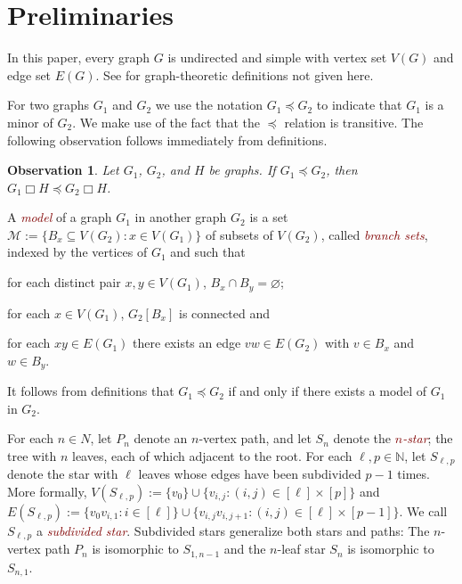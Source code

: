 \documentclass[12pt]{article}
\newcommand{\defn}[1]{\textcolor{Maroon}{\emph{#1}}}
\newcommand{\boxprod}{\mathbin{\Box}}
\newcommand{\N}{\mathbb{N}}
\renewcommand{\emptyset}{\varnothing}
\theoremstyle{plain}
\newtheorem{obs}[thm]{Observation}
\theoremstyle{definition}
\begin{document}
\section{Preliminaries}

In this paper, every graph $G$ is undirected and simple with vertex set $V(G)$ and edge set $E(G)$. See \citep{D10} for graph-theoretic definitions not given here. 




For two graphs $G_1$ and $G_2$ we use the notation $G_1\preceq G_2$ to indicate that $G_1$ is a minor of $G_2$.  We make use of the fact that the $\preceq$ relation is transitive. The following observation follows immediately from definitions.

\begin{obs}\label{minor_product}
  Let $G_1$, $G_2$, and $H$ be graphs.  If $G_1\preceq G_2$, then $G_1\boxprod H\preceq G_2\boxprod H$.
\end{obs}

A \defn{model} of a graph $G_1$ in another graph $G_2$ is a set $\mathcal{M}:=\{B_x\subseteq V(G_2): x\in V(G_1)\}$ of subsets of $V(G_2)$, called \defn{branch sets}, indexed by the vertices of $G_1$ and such that
\begin{compactenum}[(i)]
  \item for each distinct pair $x,y\in V(G_1)$, $B_x\cap B_y=\emptyset$;
  \item for each $x\in V(G_1)$, $G_2[B_x]$ is connected and
  \item for each $xy\in E(G_1)$ there exists an edge $vw\in E(G_2)$ with $v\in B_x$ and $w\in B_y$.
\end{compactenum}
It follows from definitions that $G_1\preceq G_2$ if and only if there exists a model of $G_1$ in $G_2$.

For each $n\in N$, let $P_n$ denote an $n$-vertex path, and let $S_n$ denote the \defn{$n$-star}; the tree with $n$ leaves, each of which adjacent to the root.  For each $\ell,p\in\N$, let $S_{\ell,p}$ denote the star with $\ell$ leaves whose edges have been subdivided $p-1$ times.  More formally, $V(S_{\ell,p}):=\{v_0\}\cup\{v_{i,j}:(i,j)\in[\ell]\times[p]\}$ and $E(S_{\ell,p}):=\{v_0v_{i,1}:i\in[\ell]\}\cup \{v_{i,j}v_{i,j+1}:(i,j)\in[\ell]\times[p-1]\}$.  We call $S_{\ell,p}$ a \defn{subdivided star}.  Subdivided stars generalize both stars and paths: The $n$-vertex path $P_n$ is isomorphic to $S_{1,n-1}$ and the $n$-leaf star $S_n$ is isomorphic to $S_{n,1}$.
\end{document}
